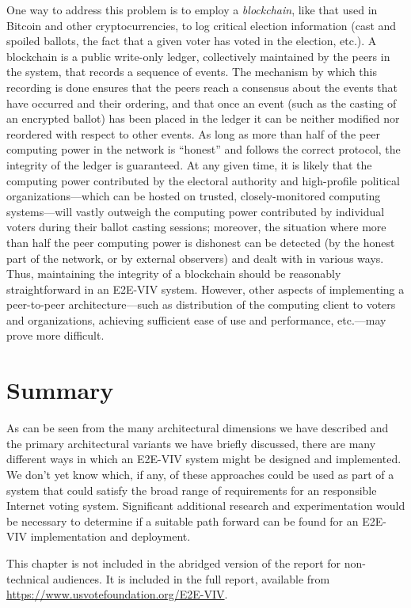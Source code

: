 One way to address this problem is to employ a \emph{blockchain}, like
that used in Bitcoin and other cryptocurrencies, to log critical
election information (cast and spoiled ballots, the fact that a given
voter has voted in the election, etc.). A blockchain is a public
write-only ledger, collectively maintained by the peers in the system,
that records a sequence of events. The mechanism by which this
recording is done ensures that the peers reach a consensus about the
events that have occurred and their ordering, and that once an event
(such as the casting of an encrypted ballot) has been placed in the
ledger it can be neither modified nor reordered with respect to other
events. As long as more than half of the peer computing power in the
network is ``honest'' and follows the correct protocol, the integrity
of the ledger is guaranteed. At any given time, it is likely that the
computing power contributed by the electoral authority and
high-profile political organizations---which can be hosted on trusted,
closely-monitored computing systems---will vastly outweigh the
computing power contributed by individual voters during their ballot
casting sessions; moreover, the situation where more than half the
peer computing power is dishonest can be detected (by the honest part
of the network, or by external observers) and dealt with in various
ways. Thus, maintaining the integrity of a blockchain should be
reasonably straightforward in an E2E-VIV system. However, other aspects
of implementing a peer-to-peer architecture---such as distribution of
the computing client to voters and organizations, achieving sufficient
ease of use and performance, etc.---may prove more difficult.

\section{Summary}

As can be seen from the many architectural dimensions we have
described and the primary architectural variants we have briefly
discussed, there are many different ways in which an E2E-VIV system
might be designed and implemented.  We don't yet know which, if any,
of these approaches could be used as part of a system that could
satisfy the broad range of requirements for an responsible Internet
voting system.  Significant additional research and experimentation
would be necessary to determine if a suitable path forward can be
found for an E2E-VIV implementation and deployment.

\else %

This chapter is not included in the abridged version of the report for
non-technical audiences. It is included in the full report,
available from \url{https://www.usvotefoundation.org/E2E-VIV}.

\fi


